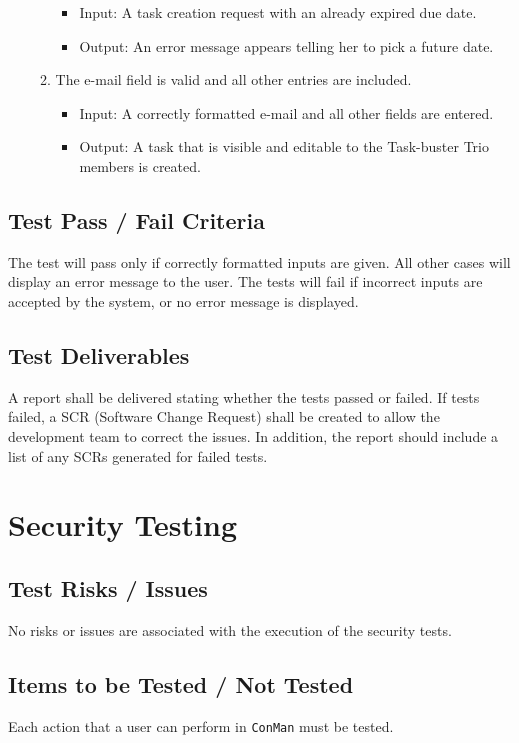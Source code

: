 \documentclass{article}
\begin{document}
\begin{enumerate}
\begin{enumerate}
\begin{itemize}
                \item Input: A task creation request with an already expired
due date.
                \item Output: An error message appears telling her to pick a
future date.
            \end{itemize}
        \item The e-mail field is valid and all other entries are included.
            \begin{itemize}
                \item Input: A correctly formatted e-mail and all other fields
are entered.
                \item Output: A task that is visible and editable to the Task-buster Trio members is created.
            \end{itemize}
    \end{enumerate}
\end{enumerate}

\subsection{Test Pass / Fail Criteria}
The test will pass only if correctly formatted inputs are given.  
All other cases will display an error message to the user.  
The tests will fail if incorrect inputs are accepted by the system, or no error message is displayed.

\subsection{Test Deliverables}
A report shall be delivered stating whether the tests passed or failed. If tests failed, a SCR
(Software Change Request) shall be created to allow the development team to correct the
issues. In addition, the report should include a list of any SCRs generated for failed 
tests.

\newpage
\section{Security Testing}
\subsection{Test Risks / Issues}
No risks or issues are associated with the execution of the security tests.

\subsection{Items to be Tested / Not Tested}
Each action that a user can perform in \texttt{ConMan} must be tested.\newline
\end{document}
